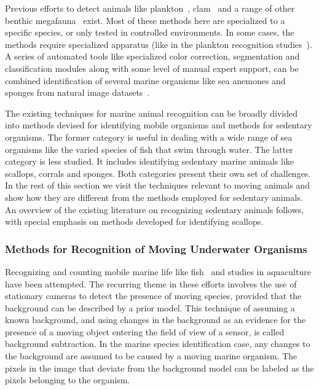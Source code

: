 Previous efforts to detect animals like plankton~\cite{mcgavin_plankton, stelzer_rotifier}, clam~\cite{forrest_clam} and a range of other benthic megafauna~\cite{schoening} exist. Most of these methods here are specialized to a specific species, or only tested in controlled environments. In some cases, the methods require specialized apparatus (like in the plankton recognition studies~\cite{mcgavin_plankton, stelzer_rotifier}). 
A series of automated tools like specialized color correction, segmentation and classification modules along with some level of manual expert support, can be combined identification of several marine organisms like sea anemones and sponges from natural image datasets~\cite{schoening}. 

The existing techniques for marine animal recognition can be broadly divided into methods devised for identifying mobile organisms and methods for sedentary organisms. The former category is useful in dealing with a wide range of sea organisms like the varied species of fish that swim through water. The latter category is less studied. It includes identifying sedentary marine animals like scallops, corrals and sponges. Both categories present their own set of challenges. In the rest of this section we visit the techniques relevant to moving animals and show how they are different from the methods employed for sedentary animals. An overview of the existing literature on recognizing sedentary animals follows, with special emphasis on methods developed for identifying scallops.


\subsubsection{Methods for Recognition of Moving Underwater Organisms}

Recognizing and counting mobile marine life like fish~\cite{spampinato, edgington, williams} and studies in aquaculture \cite{zion} have been attempted. The recurring theme in these efforts involves the use of stationary cameras to detect the presence of moving species, provided that the background can be described by a prior model. This technique of assuming a known background, and using changes in the background as an evidence for the presence of a moving object entering the field of view of a sensor, is called background subtraction. In the marine species identification case, any changes to the background are assumed to be caused by a moving marine organism. The pixels in the image that deviate from the background model can be labeled as the pixels belonging to the organism.

